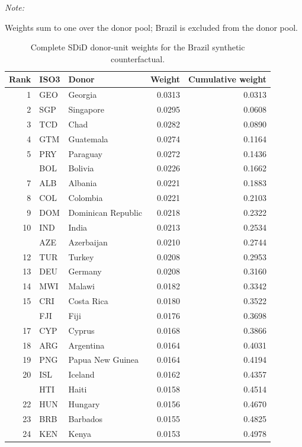 \documentclass[
  12pt,
]{article}
\begin{document}
\begin{ThreePartTable}
\begin{TableNotes}
\item \textit{Note: } 
\item Weights sum to one over the donor pool; Brazil is excluded from the donor pool.
\end{TableNotes}
\begin{longtable}[t]{rllrr}
\caption{\label{tab:sdid-unit-weights-complete}Complete SDiD donor-unit weights for the Brazil synthetic counterfactual.}\\
\toprule
Rank & ISO3 & Donor & Weight & Cumulative weight\\
\midrule
1 & GEO & Georgia & 0.0313 & 0.0313\\
2 & SGP & Singapore & 0.0295 & 0.0608\\
3 & TCD & Chad & 0.0282 & 0.0890\\
4 & GTM & Guatemala & 0.0274 & 0.1164\\
5 & PRY & Paraguay & 0.0272 & 0.1436\\
\addlinespace
6 & BOL & Bolivia & 0.0226 & 0.1662\\
7 & ALB & Albania & 0.0221 & 0.1883\\
8 & COL & Colombia & 0.0221 & 0.2103\\
9 & DOM & Dominican Republic & 0.0218 & 0.2322\\
10 & IND & India & 0.0213 & 0.2534\\
\addlinespace
11 & AZE & Azerbaijan & 0.0210 & 0.2744\\
12 & TUR & Turkey & 0.0208 & 0.2953\\
13 & DEU & Germany & 0.0208 & 0.3160\\
14 & MWI & Malawi & 0.0182 & 0.3342\\
15 & CRI & Costa Rica & 0.0180 & 0.3522\\
\addlinespace
16 & FJI & Fiji & 0.0176 & 0.3698\\
17 & CYP & Cyprus & 0.0168 & 0.3866\\
18 & ARG & Argentina & 0.0164 & 0.4031\\
19 & PNG & Papua New Guinea & 0.0164 & 0.4194\\
20 & ISL & Iceland & 0.0162 & 0.4357\\
\addlinespace
21 & HTI & Haiti & 0.0158 & 0.4514\\
22 & HUN & Hungary & 0.0156 & 0.4670\\
23 & BRB & Barbados & 0.0155 & 0.4825\\
24 & KEN & Kenya & 0.0153 & 0.4978\\

\end{longtable}
\end{ThreePartTable}
\end{document}
